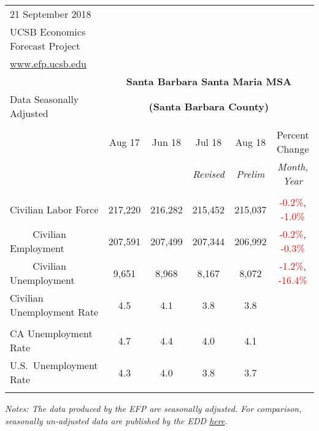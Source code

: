 \documentclass[12pt]{article}
\begin{document}
\begin{table}
\begin{tabular}{|l|c|c|c|c|c|}
\multicolumn{1}{l}{\small 21 September 2018} & \multicolumn{5}{c}{} \\
\multicolumn{1}{l}{\small UCSB Economics Forecast Project} & \multicolumn{5}{c}{} \\
\multicolumn{1}{l}{\small \href{http://www.efp.ucsb.edu/}{www.efp.ucsb.edu}} & \multicolumn{5}{c}{} \\
\multicolumn{1}{c}{} & \multicolumn{5}{c}{\large \textbf{Santa Barbara Santa Maria MSA}} \\
\multicolumn{1}{l}{\small Data Seasonally Adjusted} & \multicolumn{5}{c}{\small \textbf{(Santa Barbara County)}} \\ \hline \hline
& & & & & \\
 & Aug 17 & Jun 18 & Jul 18 & Aug 18 & Percent Change \\
 & & & \small \textit{Revised} & \small \textit{Prelim} & \small \textit{Month, Year} \\ \hline
& & & & & \\
Civilian Labor Force & 217,220 & 216,282 & 215,452 & 215,037 & \textcolor{red}{-0.2\%}, \textcolor{red}{-1.0\%} \\
$\qquad$ \small Civilian Employment & 207,591 & 207,499 & 207,344 & 206,992 & \textcolor{red}{-0.2\%}, \textcolor{red}{-0.3\%} \\
$\qquad$ \small Civilian Unemployment & 9,651 & 8,968 & 8,167 & 8,072 & \textcolor{red}{-1.2\%}, \textcolor{red}{-16.4\%} \\
Civilian Unemployment Rate & 4.5 & 4.1 & 3.8 & 3.8 & \\
& & & & & \\
CA Unemployment Rate & 4.7 & 4.4 & 4.0 & 4.1 & \\
U.S.\ Unemployment Rate & 4.3 & 4.0 & 3.8 & 3.7 & \\
& & & & & \\ \hline \hline
\end{tabular}
\par
\vspace{.5em}
\footnotesize
\textit{Notes: The data produced by the EFP are seasonally adjusted. For comparison, seasonally un-adjusted data are published by the EDD \href{http://www.labormarketinfo.ca.gov/file/lfmonth/satb$pds.pdf}{here}.}
\end{table}
\end{document}
